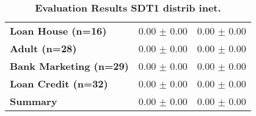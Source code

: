 \begin{table}[htb]
{\begin{tabular}{lll}
\textbf{Loan House (n=16)                        } &  \phantom{0}0.00 $\pm$ \phantom{0}0.00 &             \phantom{0}0.00 $\pm$ \phantom{0}0.00 \\
\textbf{Adult (n=28)                             } &  \phantom{0}0.00 $\pm$ \phantom{0}0.00 &             \phantom{0}0.00 $\pm$ \phantom{0}0.00 \\
\textbf{Bank Marketing (n=29)                    } &  \phantom{0}0.00 $\pm$ \phantom{0}0.00 &             \phantom{0}0.00 $\pm$ \phantom{0}0.00 \\
\textbf{Loan Credit (n=32)                       } &  \phantom{0}0.00 $\pm$ \phantom{0}0.00 &             \phantom{0}0.00 $\pm$ \phantom{0}0.00 \\
\midrule
\textbf{Summary                                  } &  \phantom{0}0.00 $\pm$ \phantom{0}0.00 &             \phantom{0}0.00 $\pm$ \phantom{0}0.00 \\
\bottomrule
\end{tabular}%
}
\caption{\textbf{Evaluation Results SDT1 distrib inet.}}
\label{tab:eval-results}
\end{table}


